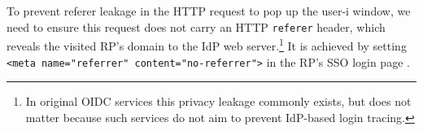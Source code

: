 To prevent referer leakage in the HTTP request to pop up the user-i window,
 we need to ensure this request does not carry an HTTP \texttt{referer} header, which reveals the visited RP's domain to the IdP web server.\footnote{In original OIDC services this privacy leakage commonly exists, but does not matter because such services do not aim to prevent IdP-based login tracing.} %
%
It is achieved by setting
\verb+<meta name="referrer" content="no-referrer">+
in the RP's SSO login page \cite{referer_policy}.


%

